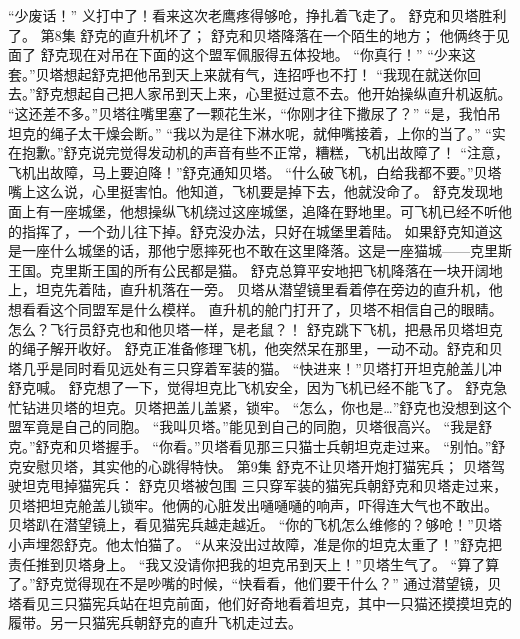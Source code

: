 \documentclass[a4paper,12pt,UTF8,twoside]{ctexbook}
\begin{document}
        “少废话！” 
        义打中了！看来这次老鹰疼得够呛，挣扎着飞走了。 
        舒克和贝塔胜利了。   第8集 
        舒克的直升机坏了； 
        舒克和贝塔降落在一个陌生的地方； 
        他俩终于见面了   
        舒克现在对吊在下面的这个盟军佩服得五体投地。 
        “你真行！” 
        “少来这套。”贝塔想起舒克把他吊到天上来就有气，连招呼也不打！ 
        “我现在就送你回去。”舒克想起自己把人家吊到天上来，心里挺过意不去。他开始操纵直升机返航。 
        “这还差不多。”贝塔往嘴里塞了一颗花生米，“你刚才往下撒尿了？” 
        “是，我怕吊坦克的绳子太干燥会断。” 
        “我以为是往下淋水呢，就伸嘴接着，上你的当了。” 
        “实在抱歉。”舒克说完觉得发动机的声音有些不正常，糟糕，飞机出故障了！ 
        “注意，飞机出故障，马上要迫降！”舒克通知贝塔。 
        “什么破飞机，白给我都不要。”贝塔嘴上这么说，心里挺害怕。他知道，飞机要是掉下去，他就没命了。 
        舒克发现地面上有一座城堡，他想操纵飞机绕过这座城堡，追降在野地里。可飞机已经不听他的指挥了，一个劲儿往下掉。舒克没办法，只好在城堡里着陆。 
        如果舒克知道这是一座什么城堡的话，那他宁愿摔死也不敢在这里降落。这是一座猫城——克里斯王国。克里斯王国的所有公民都是猫。 
        舒克总算平安地把飞机降落在一块开阔地上，坦克先着陆，直升机落在一旁。 
        贝塔从潜望镜里看着停在旁边的直升机，他想看看这个同盟军是什么模样。 
        直升机的舱门打开了，贝塔不相信自己的眼睛。怎么？飞行员舒克也和他贝塔一样，是老鼠？！ 
        舒克跳下飞机，把悬吊贝塔坦克的绳子解开收好。 
        舒克正准备修理飞机，他突然呆在那里，一动不动。舒克和贝塔几乎是同时看见远处有三只穿着军装的猫。 
        “快进来！”贝塔打开坦克舱盖儿冲舒克喊。 
        舒克想了一下，觉得坦克比飞机安全，因为飞机已经不能飞了。 
        舒克急忙钻进贝塔的坦克。贝塔把盖儿盖紧，锁牢。 
        “怎么，你也是…”舒克也没想到这个盟军竟是自己的同胞。 
        “我叫贝塔。”能见到自己的同胞，贝塔很高兴。 
        “我是舒克。”舒克和贝塔握手。 
        “你看。”贝塔看见那三只猫士兵朝坦克走过来。 
        “别怕。”舒克安慰贝塔，其实他的心跳得特快。   第9集 
        舒克不让贝塔开炮打猫宪兵； 
        贝塔驾驶坦克甩掉猫宪兵： 
        舒克贝塔被包围   
        三只穿军装的猫宪兵朝舒克和贝塔走过来，贝塔把坦克舱盖儿锁牢。他俩的心脏发出嗵嗵嗵的响声，吓得连大气也不敢出。 
        贝塔趴在潜望镜上，看见猫宪兵越走越近。 
        “你的飞机怎么维修的？够呛！”贝塔小声埋怨舒克。他太怕猫了。 
        “从来没出过故障，准是你的坦克太重了！”舒克把责任推到贝塔身上。 
        “我又没请你把我的坦克吊到天上！”贝塔生气了。 
        “算了算了。”舒克觉得现在不是吵嘴的时候，“快看看，他们要干什么？” 
        通过潜望镜，贝塔看见三只猫宪兵站在坦克前面，他们好奇地看着坦克，其中一只猫还摸摸坦克的履带。另一只猫宪兵朝舒克的直升飞机走过去。 
\end{document}

